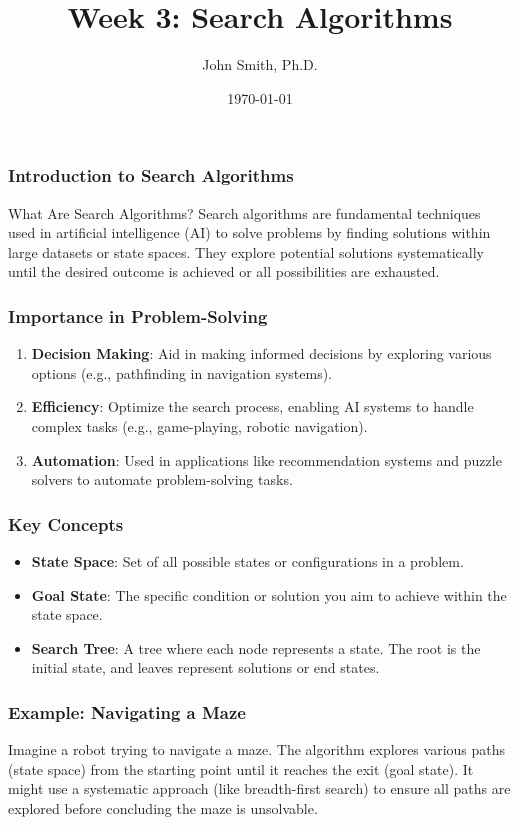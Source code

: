 \documentclass[aspectratio=169]{beamer}
\title[Week 3: Search Algorithms]{Week 3: Search Algorithms}
\author[J. Smith]{John Smith, Ph.D.}
\institute[University Name]{
  Department of Computer Science\\
  University Name\\
  \vspace{0.3cm}
  Email: email@university.edu\\
  Website: www.university.edu
}
\date{\today}
\begin{document}
\frame{\titlepage}

\begin{frame}[fragile]
    \frametitle{Introduction to Search Algorithms}
    \begin{block}{What Are Search Algorithms?}
        Search algorithms are fundamental techniques used in artificial intelligence (AI) to solve problems by finding solutions within large datasets or state spaces. They explore potential solutions systematically until the desired outcome is achieved or all possibilities are exhausted.
    \end{block}
\end{frame}

\begin{frame}[fragile]
    \frametitle{Importance in Problem-Solving}
    \begin{enumerate}
        \item \textbf{Decision Making}: Aid in making informed decisions by exploring various options (e.g., pathfinding in navigation systems).
        \item \textbf{Efficiency}: Optimize the search process, enabling AI systems to handle complex tasks (e.g., game-playing, robotic navigation).
        \item \textbf{Automation}: Used in applications like recommendation systems and puzzle solvers to automate problem-solving tasks.
    \end{enumerate}
\end{frame}

\begin{frame}[fragile]
    \frametitle{Key Concepts}
    \begin{itemize}
        \item \textbf{State Space}: Set of all possible states or configurations in a problem. 
        \item \textbf{Goal State}: The specific condition or solution you aim to achieve within the state space.
        \item \textbf{Search Tree}: A tree where each node represents a state. The root is the initial state, and leaves represent solutions or end states.
    \end{itemize}
\end{frame}

\begin{frame}[fragile]
    \frametitle{Example: Navigating a Maze}
    Imagine a robot trying to navigate a maze. The algorithm explores various paths (state space) from the starting point until it reaches the exit (goal state). It might use a systematic approach (like breadth-first search) to ensure all paths are explored before concluding the maze is unsolvable.
\end{frame}
\end{document}
